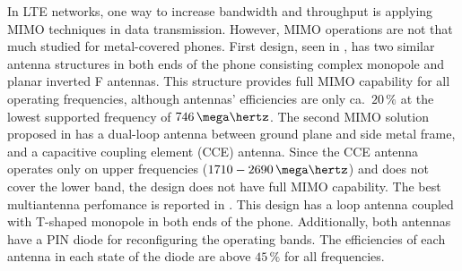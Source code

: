 In LTE networks, one way to increase bandwidth and throughput is applying MIMO techniques in data transmission. However, MIMO operations are not that much studied for metal-covered phones. First design, seen in \cite{son_wideband_mimo}, has two similar antenna structures in both ends of the phone consisting complex monopole and planar inverted F antennas. This structure provides full MIMO capability for all operating frequencies, although antennas' efficiencies are only ca.\ $20\,\%$ at the lowest supported frequency of $746\,\mega\hertz$. The second MIMO solution proposed in \cite{stanley_lte_mimo} has a dual-loop antenna between ground plane and side metal frame, and a capacitive coupling element (CCE) antenna. Since the CCE antenna operates only on upper frequencies ($1710-2690\,\mega\hertz$) and does not cover the lower band, the design does not have full MIMO capability. The best multiantenna perfomance is reported in \cite{reconf_narrow}. This design has a loop antenna coupled with T-shaped monopole in both ends of the phone. Additionally, both antennas have a PIN diode for reconfiguring the operating bands. The efficiencies of each antenna in each state of the diode are above $45\,\%$ for all frequencies.



